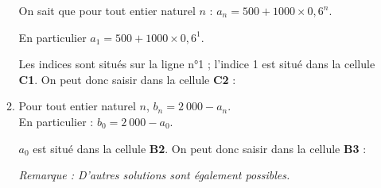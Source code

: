 \begin{corrige}
\begin{enumerate}
\begin{enumerate}[label=\alph*.]
               On sait que pour tout entier naturel $n$ : $a_{n}=500+1000 \times 0,6^n$.
               \par
               En particulier $a_1=500+1000 \times 0,6^1$.
               \par
               Les indices sont situés sur la ligne n°1 ; l'indice 1 est situé dans la cellule \textbf{C1}. On peut donc saisir dans la cellule \textbf{C2} :
               \par
               \begin{center}
               \end{center}
               \item %
               Pour tout entier naturel $n$, $b_n=2~000-a_n$.\\
               En particulier : ${b_0=2~000-a_0}$.
               \par
               $a_0$ est situé dans la cellule \textbf{B2}. On peut donc saisir dans la cellule \textbf{B3} :
               \par
               \begin{center}
               \end{center}
               \par
               \textit{Remarque : D'autres solutions sont également possibles.}
               \par
               \par
          \end{enumerate}
          \par
     \end{enumerate}
\end{corrige}
